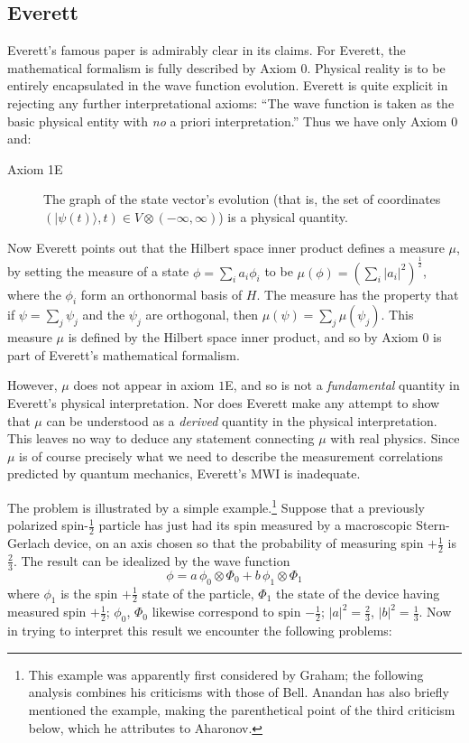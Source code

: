 \documentclass[aps,pra,12pt]{revtex4}
\def\ket#1{| #1\rangle}
\begin{document}
\subsection{Everett}

Everett's famous paper\cite{ev} is admirably clear in its claims. 
For Everett, the mathematical formalism is fully described by Axiom $0$. 
Physical reality is to be entirely encapsulated in the wave function 
evolution. 
Everett is quite explicit in rejecting any further interpretational
axioms: ``The wave function is taken as the basic physical entity 
with {\em no} a priori interpretation.''
Thus we have only Axiom $0$ and:
\begin{description}
\item[Axiom 1E] The graph of the state vector's evolution 
(that is, the set of coordinates
$(\ket {\psi (t)},t) \in V \otimes (-\infty , \infty)$)
is a physical quantity. 
\end{description}

Now Everett points out that 
the Hilbert space inner product defines a measure $\mu$, by setting the measure
of a state \mbox{$\phi = \sum_{i} a_i \phi_i$} to be \mbox{$\mu( \phi ) = 
(\sum_i | a_i |^2 )^{\frac{1}{2}}$}, where the $\phi_i $ form an orthonormal 
basis of $H$. The measure has the property that if $\psi = \sum_j \psi_j$ and
the $\psi_j$ are orthogonal, then $\mu (\psi ) = \sum_j \mu (\psi_j )$. 
This measure $\mu$ is defined by the Hilbert space inner product, and so
by Axiom $0$ is part of Everett's mathematical formalism.

However, $\mu$ does not appear in axiom $1$E, and 
so is not a {\em fundamental} 
quantity in Everett's physical interpretation.
Nor does Everett make any attempt to show that $\mu$ can be understood as
a {\em derived} quantity in the physical interpretation. 
This leaves no way to deduce any statement connecting $\mu$ with real physics.
Since $\mu$ is of course precisely what we need to describe the measurement
correlations predicted by quantum mechanics, Everett's MWI is 
inadequate. 

The problem is illustrated by a simple 
example.\footnote{This example was apparently
first considered by Graham;\cite{gr} the 
following analysis combines his criticisms with those of Bell.\cite{bell2}
Anandan\cite{anandan} has also briefly mentioned the example, making the 
parenthetical point of the third criticism below, which he attributes to 
Aharonov.} 
Suppose that a previously polarized 
spin-$\frac{1}{2}$ particle has just had its 
spin measured by
a macroscopic Stern-Gerlach device, on an axis chosen so that 
the probability of measuring spin $+\frac{1}{2}$ is $\frac{2}{3}$. 
The result can be idealized by the wave function
\begin{equation}
\phi = a \, \phi_0 \otimes \Phi_0 + b \, \phi_1 \otimes \Phi_1
\end{equation}
where $\phi_1$ is the spin $+\frac{1}{2}$ state of 
the particle, $\Phi_1$ the state of the device having measured 
spin $+\frac{1}{2}$; $\phi_0$, $\Phi_0$ likewise correspond to 
spin $-\frac{1}{2}$; $|a|^2 = \frac{2}{3}$, $|b|^2 = \frac{1}{3}$.
Now in trying to interpret this result we encounter the following problems:
\end{document}
